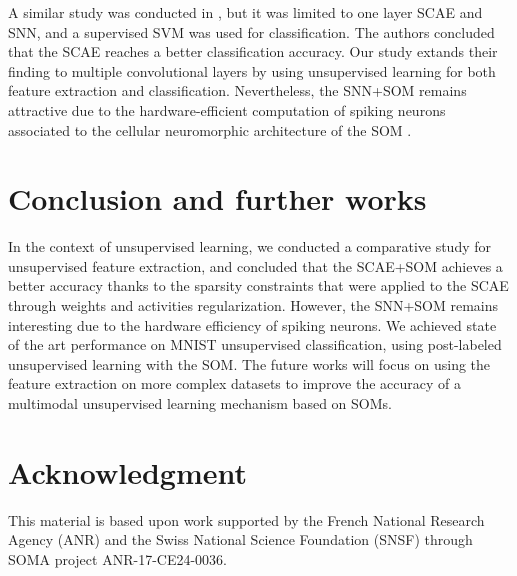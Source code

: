 \documentclass[runningheads]{llncs}
\begin{document}
A similar study was conducted in \cite{falez2019feature_learning}, but it was limited to one layer SCAE and SNN, and a supervised SVM was used for classification. The authors concluded that the SCAE reaches a better classification accuracy. Our study extands their finding to multiple convolutional layers by using unsupervised learning for both feature extraction and classification.
Nevertheless, the SNN+SOM remains attractive due to the hardware-efficient computation of spiking neurons \cite{khacef2018mlp_vs_snn} associated to the cellular neuromorphic architecture of the SOM \cite{rodriguez2018grid_som}.



\section{Conclusion and further works}
\label{sec_conclusion}
In the context of unsupervised learning, we conducted a comparative study for unsupervised feature extraction, and concluded that the SCAE+SOM achieves a better accuracy thanks to the sparsity constraints that were applied to the SCAE through weights and activities regularization. However, the SNN+SOM remains interesting due to the hardware efficiency of spiking neurons. We achieved state of the art performance on MNIST unsupervised classification, using post-labeled unsupervised learning with the SOM. The future works will focus on using the feature extraction on more complex datasets to improve the accuracy of a multimodal unsupervised learning mechanism \cite{khacef2020cdz} based on SOMs.



\section*{Acknowledgment}
This material is based upon work supported by the French National Research Agency (ANR) and the Swiss National Science Foundation (SNSF) through SOMA project ANR-17-CE24-0036.
\end{document}
